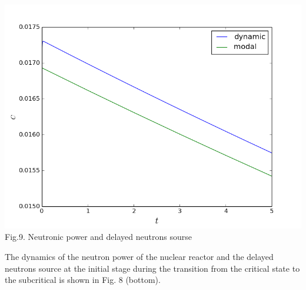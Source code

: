 \documentclass[a1paper,fontscale=0.6]{poster}
\begin{document}
\begin{poster}
{\begin{minipage}{0.5\textwidth}
\begin{center}
\includegraphics[width=0.75\linewidth]{scmm/18.png}\\
\vspace{-0.5em}
\footnotesize{Fig.9. Neutronic power and delayed neutrons sourse}
\end{center}
\end{minipage}

\vspace{0.5em}
The dynamics of the neutron power of the nuclear reactor and the delayed neutrons source at the initial stage during the transition from the critical state to the subcritical is shown in Fig. 8 (bottom). 

}
\end{poster}
\end{document}
